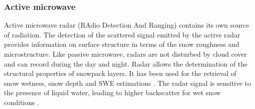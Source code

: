\documentclass[utf8]{frontiersSCNS} %
\begin{document}





\subsubsection{Active microwave}


Active microwave radar (RAdio Detection And Ranging) contains its own source of radiation. The detection of the scattered signal emitted by the active radar provides information on surface structure in terms of the snow roughness and microstructure. Like passive microwave, radars are not disturbed by cloud cover and can record during the day and night. Radar allows the determination of the structural properties of snowpack layers. It has been used for the retrieval of snow wetness, snow depth and SWE estimations \citep{Schmid_2014}. The radar signal is sensitive to the presence of liquid water, leading to higher backscatter for wet snow conditions \citep{Magagi_2003}. 
\end{document}
